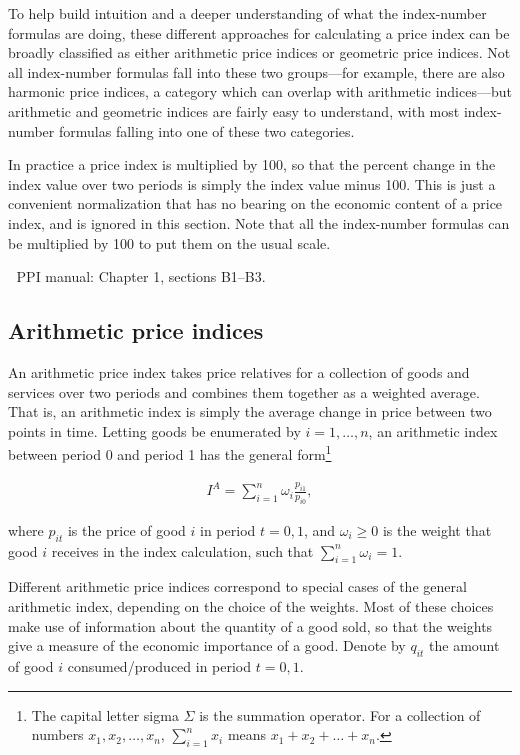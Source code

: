 \documentclass[]{article}
\begin{document}
To help build intuition and a deeper understanding of what the index-number formulas are doing, these different approaches for calculating a price index can be broadly classified as either arithmetic price indices or geometric price indices. Not all index-number formulas fall into these two groups---for example, there are also harmonic price indices, a category which can overlap with arithmetic indices---but arithmetic and geometric indices are fairly easy to understand, with most index-number formulas falling into one of these two categories.

In practice a price index is multiplied by 100, so that the percent change in the index value over two periods is simply the index value minus 100. This is just a convenient normalization that has no bearing on the economic content of a price index, and is ignored in this section. Note that all the index-number formulas can be multiplied by 100 to put them on the usual scale.

📖 PPI manual: Chapter 1, sections B1--B3.

\hypertarget{arithmetic-price-indices}{%
\subsection{Arithmetic price indices}\label{arithmetic-price-indices}}

An arithmetic price index takes price relatives for a collection of goods and services over two periods and combines them together as a weighted average. That is, an arithmetic index is simply the average change in price between two points in time. Letting goods be enumerated by \(i = 1,\ldots, n\), an arithmetic index between period 0 and period 1 has the general form\footnote{The capital letter sigma \(\Sigma\) is the summation operator. For a collection of numbers \(x_{1}, x_{2},\ldots,x_{n}\), \(\sum_{i=1}^{n} x_{i}\) means \(x_{1} + x_{2} + \ldots + x_{n}\).}

\begin{align*}
I^{A} = \sum_{i = 1}^{n} \omega_{i} \frac{p_{i1}}{p_{i0}},
\end{align*}

where \(p_{it}\) is the price of good \(i\) in period \(t = 0,1\), and \(\omega_{i} \geq 0\) is the weight that good \(i\) receives in the index calculation, such that \(\sum_{i = 1}^{n} \omega_{i} = 1\).

Different arithmetic price indices correspond to special cases of the general arithmetic index, depending on the choice of the weights. Most of these choices make use of information about the quantity of a good sold, so that the weights give a measure of the economic importance of a good. Denote by \(q_{it}\) the amount of good \(i\) consumed/produced in period \(t = 0,1\).
\end{document}
